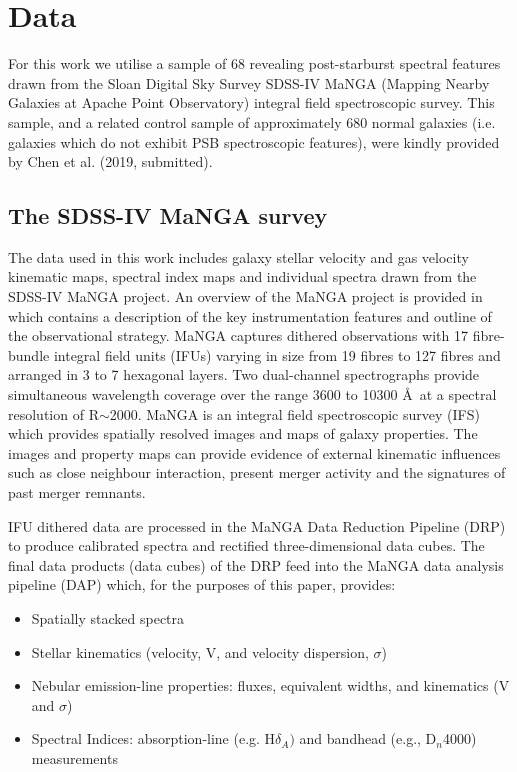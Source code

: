 \section{Data}
\label{sec:data}

For this work we utilise a sample of 68 revealing post-starburst spectral features drawn from the Sloan Digital Sky Survey SDSS-IV MaNGA (Mapping Nearby Galaxies at Apache Point Observatory) integral field spectroscopic survey. This sample, and a related control sample of approximately 680 normal galaxies (i.e. galaxies which do not exhibit PSB spectroscopic features),  were kindly provided by Chen et al. (2019, submitted).

\subsection{The SDSS-IV MaNGA survey}
\label{sec:MaNGA}
The data used in this work includes galaxy stellar velocity and gas velocity kinematic maps, spectral index maps and individual spectra drawn from the SDSS-IV MaNGA project. An overview of the MaNGA project is provided in \citet{2015ApJ...798....7B} which contains a description of the key instrumentation features and outline of the observational strategy. MaNGA captures dithered observations with 17 fibre-bundle integral
field units (IFUs) varying in size from 19 fibres to 127 fibres and arranged in 3 to 7 hexagonal layers. Two dual-channel spectrographs provide
simultaneous wavelength coverage over the range 3600 to 10300 \AA\ at a spectral resolution of R$\sim$2000. MaNGA is an integral field spectroscopic survey (IFS) which provides spatially resolved images and maps of galaxy properties. The images and property maps can provide evidence of external kinematic influences such as close neighbour interaction, present merger activity and the signatures of past merger remnants.

IFU dithered data are processed in the MaNGA Data Reduction Pipeline (DRP) to produce calibrated spectra and rectified three-dimensional data cubes. The final data products (data cubes) of the DRP feed into the MaNGA data analysis pipeline (DAP) \citep{2016AJ....152...83L,2019arXiv190100856W} which, for the purposes of this paper, provides:
\begin{itemize}
    \item Spatially stacked spectra
    \item Stellar kinematics (velocity, V, and velocity dispersion, $\sigma$)
    \item Nebular emission-line properties: fluxes, equivalent widths, and kinematics (V and $\sigma$)
    \item Spectral Indices: absorption-line (e.g.  H$\delta_A)$ and bandhead (e.g., D$_n$4000) measurements
\end{itemize}

